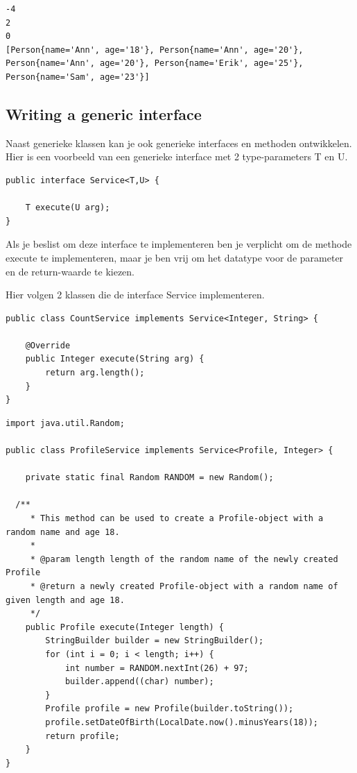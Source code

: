 \begin{verbatim}
-4
2
0
[Person{name='Ann', age='18'}, Person{name='Ann', age='20'}, Person{name='Ann', age='20'}, Person{name='Erik', age='25'}, Person{name='Sam', age='23'}]
\end{verbatim}



\subsection{Writing a generic interface}

Naast generieke klassen kan je ook generieke interfaces en methoden ontwikkelen.
Hier is een voorbeeld van een generieke interface met 2 type-parameters T en U.

\begin{lstlisting}
public interface Service<T,U> {

	T execute(U arg);
}
\end{lstlisting}

Als je beslist om deze interface te implementeren ben je verplicht om de methode execute te implementeren, maar je ben vrij om het datatype voor de parameter en de return-waarde te kiezen.

Hier volgen 2 klassen die de interface Service implementeren.

\begin{lstlisting}
public class CountService implements Service<Integer, String> {

	@Override
	public Integer execute(String arg) {
		return arg.length();
	}
}
\end{lstlisting}

\begin{lstlisting}
import java.util.Random;

public class ProfileService implements Service<Profile, Integer> {

	private static final Random RANDOM = new Random();

  /**
	 * This method can be used to create a Profile-object with a random name and age 18.
	 *
	 * @param length length of the random name of the newly created Profile
	 * @return a newly created Profile-object with a random name of given length and age 18.
	 */
	public Profile execute(Integer length) {
		StringBuilder builder = new StringBuilder();
		for (int i = 0; i < length; i++) {
			int number = RANDOM.nextInt(26) + 97;
			builder.append((char) number);
		}
		Profile profile = new Profile(builder.toString());
		profile.setDateOfBirth(LocalDate.now().minusYears(18));
		return profile;
	}
}
\end{lstlisting}



